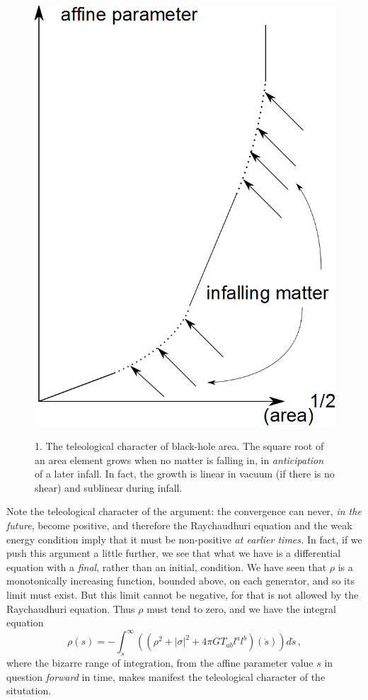 \documentclass[
%
draft    %
,numberedheadings 
,bibliocites
  ]
  {aipproc}
\newcommand{\as}{{\acute s}}
\begin{document}
\begin{figure}
\vspace{-2em}
  \begin{flushright}
{\includegraphics[width=.35\textwidth]{AreaNonTel.png}}
\makebox[.35\textwidth]{$\ $ }
\vspace{-2em}
\parbox{.35\textwidth}{1. The teleological character of black-hole area.  The square root of an area element grows when no matter is falling in, in {\em anticipation} of a later infall.  In fact, the growth is linear in vacuum (if there is no shear) and sublinear during infall.}
\end{flushright}
\vspace{.5em}
\label{fig:telarea}
\end{figure}

Note the teleological character of the argument:  the convergence can never, {\em in the future}, become positive, and therefore the Raychaudhuri equation and the weak energy condition imply that it must be non-positive {\em at earlier times.}
In fact, if we push this argument a little further, we see that what we have is a differential equation with a {\em final}, rather than an initial, condition.  We have seen that $\rho$ is a monotonically increasing function, bounded above, on each generator, and so its limit must exist.  But this limit cannot be negative, for that is not allowed by the Raychaudhuri equation.  Thus $\rho$ must tend to zero, and we have the integral equation
\begin{equation}\label{rhoint}
\rho (s)=-\int _{s}^\infty ( (\rho ^2+|\sigma |^2 +4\pi G T_{ab}l^al^b)(\as ) )d\as\, ,
\end{equation}
where the bizarre range of integration, from the affine parameter value $s$ in question {\em forward} in time, makes manifest the teleological character of the situtation.
\end{document}
